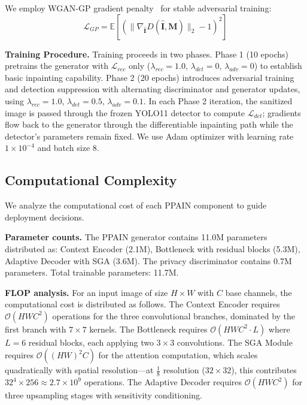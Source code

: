 \documentclass[preprint,12pt]{elsarticle}
\begin{document}
We employ WGAN-GP gradient penalty~\cite{gulrajani2017improved} for stable adversarial training:
\begin{equation}
\mathcal{L}_{GP} = \mathbb{E}\left[(\|\nabla_{\hat{\mathbf{I}}} D(\hat{\mathbf{I}}, \mathbf{M})\|_2 - 1)^2\right]
\end{equation}

\textbf{Training Procedure.} Training proceeds in two phases. Phase 1 (10 epochs) pretrains the generator with $\mathcal{L}_{rec}$ only ($\lambda_{rec}=1.0$, $\lambda_{det}=0$, $\lambda_{adv}=0$) to establish basic inpainting capability. Phase 2 (20 epochs) introduces adversarial training and detection suppression with alternating discriminator and generator updates, using $\lambda_{rec}=1.0$, $\lambda_{det}=0.5$, $\lambda_{adv}=0.1$. In each Phase 2 iteration, the sanitized image is passed through the frozen YOLO11 detector to compute $\mathcal{L}_{det}$; gradients flow back to the generator through the differentiable inpainting path while the detector's parameters remain fixed. We use Adam optimizer with learning rate $1 \times 10^{-4}$ and batch size 8.

\subsection{Computational Complexity}

We analyze the computational cost of each PPAIN component to guide deployment decisions.

\textbf{Parameter counts.} The PPAIN generator contains 11.0M parameters distributed as: Context Encoder (2.1M), Bottleneck with residual blocks (5.3M), Adaptive Decoder with SGA (3.6M). The privacy discriminator contains 0.7M parameters. Total trainable parameters: 11.7M.

\textbf{FLOP analysis.} For an input image of size $H \times W$ with $C$ base channels, the computational cost is distributed as follows. The Context Encoder requires $\mathcal{O}(HWC^2)$ operations for the three convolutional branches, dominated by the first branch with $7 \times 7$ kernels. The Bottleneck requires $\mathcal{O}(HWC^2 \cdot L)$ where $L=6$ residual blocks, each applying two $3 \times 3$ convolutions. The SGA Module requires $\mathcal{O}((HW)^2 C)$ for the attention computation, which scales quadratically with spatial resolution---at $\frac{1}{8}$ resolution ($32 \times 32$), this contributes $32^4 \times 256 \approx 2.7 \times 10^9$ operations. The Adaptive Decoder requires $\mathcal{O}(HWC^2)$ for three upsampling stages with sensitivity conditioning.
\end{document}
